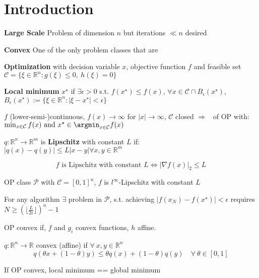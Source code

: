 \section{Introduction}

\textbf{Large Scale}
Problem of dimension $n$ but iterations $\ll n$ desired

\textbf{Convex}
One of the only problem classes that are 

\textbf{Optimization}
with decision variable $x$, objective function $f$ and
feasible set $\mathcal{C} = \{\xi \in \mathbb{R}^{n}: g(\xi)\le0,\ h(\xi)=0\}$

\textbf{Local minimum}
$x^\star$ if $\exists\epsilon>0$ s.t. $f(x^\star)\leq f(x)$,
$\forall x \in \mathcal{C} \cap B_\epsilon(x^\star)$,
$B_\epsilon(x^\star):=\{\xi\in\mathbb{R}^{n}:|\xi-x^\star|<\epsilon\}$


\begin{proposition}
	$f$ (lower-semi-)continuous,
	$f(x)\rightarrow\infty$
	for $|x|\rightarrow\infty$,
	$\mathcal{C}$ closed
	$\Rightarrow$ \exists\ of OP with:
	$\min_{x \in \mathcal{C}} f(x)\ \text{and}\ x^\star\in\argmin_{x \in \mathcal{C}}f(x)$
\end{proposition}


\begin{definition}
	$q: \mathbb{R}^{n} \rightarrow \mathbb{R}^{m}$
	is \textbf{Lipschitz} with constant $L$ if:
	$|q(x)-q(y)| \le L |x-y| \forall x,y \in \mathbb{R}^{m}$
\end{definition}

$$f \text{ is Lipschitz with constant } L
	\Leftrightarrow
	|\nabla f(x)|_2\le L$$

OP class $\mathcal{P}$ with $\mathcal{C}=[0,1]^n$,
$f$ is $l^\infty$-Lipschitz with constant $L$

\begin{proposition}
	For any algorithm $\exists$ problem in $\mathcal{P}$,
	s.t. achieving $|f(x_N )−f(x^⋆)| < \epsilon$
	requires
	$N \ge (\lfloor\frac{L}{2\epsilon}\rfloor)^n-1$
\end{proposition}

\begin{definition}
	OP convex if, $f$ and $g_i$ convex functions, $h$ affine.
\end{definition}


\begin{definition}
	$q:\mathbb{R}^{n}\rightarrow\mathbb{R}$
	convex (affine) if $\forall\ x, y \in \mathbb{R}^{n}$
	$$q(\theta x+(1−\theta)y)\le\theta q(x)+(1−\theta)q(y)\quad\forall\ \theta \in [0, 1]$$
\end{definition}
\begin{proposition}
	If OP convex, local minimum == global minimum
\end{proposition}

